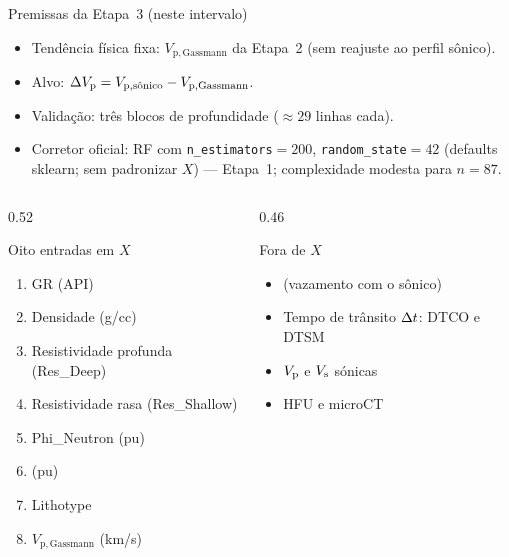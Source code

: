 \documentclass[aspectratio=169,10pt]{beamer}
\begin{document}
\begin{frame}[shrink=15]{Premissas da Etapa~3 (neste intervalo)}
  \scriptsize
  \begin{itemize}\setlength{\itemsep}{0.12em}\setlength{\parsep}{0pt}\setlength{\topsep}{0.1em}
    \item Tendência física fixa: $V_{\mathrm{p,Gassmann}}$ da Etapa~2
          (sem reajuste ao perfil sônico).
    \item Alvo: $\dVp = \Vpsonsub - V_{\mathrm{p,Gassmann}}$.
    \item Validação: três blocos de profundidade ($\approx 29$ linhas cada).
    \item Corretor oficial: RF com
          \texttt{n\_estimators}${}=200$, \texttt{random\_state}${}=42$
          (defaults sklearn; sem padronizar $X$) ---
          Etapa~1; complexidade modesta para $n=87$.
  \end{itemize}
  \vspace{0.02cm}
  \begin{columns}[T,onlytextwidth]
    \begin{column}{0.52\textwidth}
      \begin{block}{Oito entradas em $X$}
        \scriptsize
        \begin{enumerate}\setlength{\itemsep}{0.02em}\setlength{\parsep}{0pt}\setlength{\topsep}{0.05em}
          \item GR (API)
          \item Densidade (g/cc)
          \item Resistividade profunda (Res\_Deep)
          \item Resistividade rasa (Res\_Shallow)
          \item Phi\_Neutron (pu)
          \item \phiND{} (pu)
          \item Lithotype
          \item $V_{\mathrm{p,Gassmann}}$ (km/s)
        \end{enumerate}
      \end{block}
    \end{column}
    \begin{column}{0.46\textwidth}
      \begin{exampleblock}{Fora de $X$}
        \scriptsize
        \begin{itemize}\setlength{\itemsep}{0.04em}\setlength{\parsep}{0pt}\setlength{\topsep}{0.05em}
          \item \phiS{} (vazamento com o sônico)
          \item Tempo de trânsito $\Dt$: DTCO e DTSM
          \item $\Vp$ e $\Vs$ sónicas
          \item HFU e microCT
        \end{itemize}
      \end{exampleblock}
    \end{column}
  \end{columns}
\end{frame}
\end{document}
